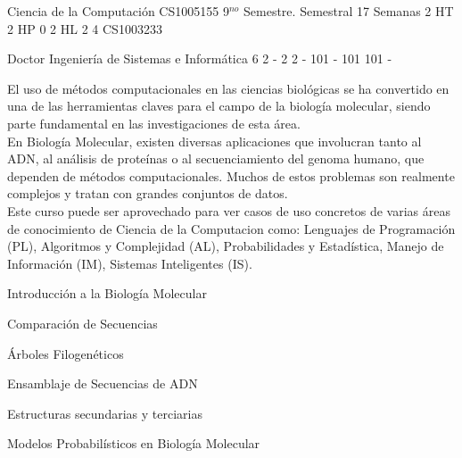 \documentclass[a4paper,8pt]{article}
\begin{document}
\setNombreProfesor{}
\setGradoProfesorAbreviado{}
\sylabusHeader

\academicaTable
{Ciencia de la Computación} %
{CS1005155} %
{9$^{no}$ Semestre.} %
{Semestral} %
{17 Semanas} %
{2 HT} %
{2 HP} %
{0} %
{2 HL}  %
{2} %
{4} %
{CS1003233} %

\administrativaTable
{Doctor} %
{Ingeniería de Sistemas e Informática} %
{6} %
{2} %
{-} %
{2} %
{2} %
{-} %
{101} %
{-} %
{101} %
{101} %
{-} %


\begin{fundamentacion}
El uso de métodos computacionales en las ciencias biológicas se ha convertido en una de las herramientas claves para el campo de la biología molecular, siendo parte fundamental en las investigaciones de esta área. 
\\
En Biología Molecular, existen diversas aplicaciones que involucran tanto al ADN, al análisis de proteínas o al secuenciamiento del genoma humano, que dependen de métodos computacionales. Muchos de estos problemas son realmente complejos y tratan con grandes conjuntos de datos. 
\\
Este curso puede ser aprovechado para ver casos de uso concretos de varias áreas de conocimiento de Ciencia de la Computacion como: Lenguajes de Programación (PL), Algoritmos y Complejidad (AL), Probabilidades y Estadística, Manejo de Información (IM), Sistemas Inteligentes (IS).

\end{fundamentacion}

\begin{sumilla}
\item Introducción a la Biología Molecular
\item Comparación de Secuencias
\item Árboles Filogenéticos
\item Ensamblaje de Secuencias de ADN
\item Estructuras secundarias y terciarias
\item Modelos Probabilísticos en Biología Molecular

\end{sumilla}
\end{document}
